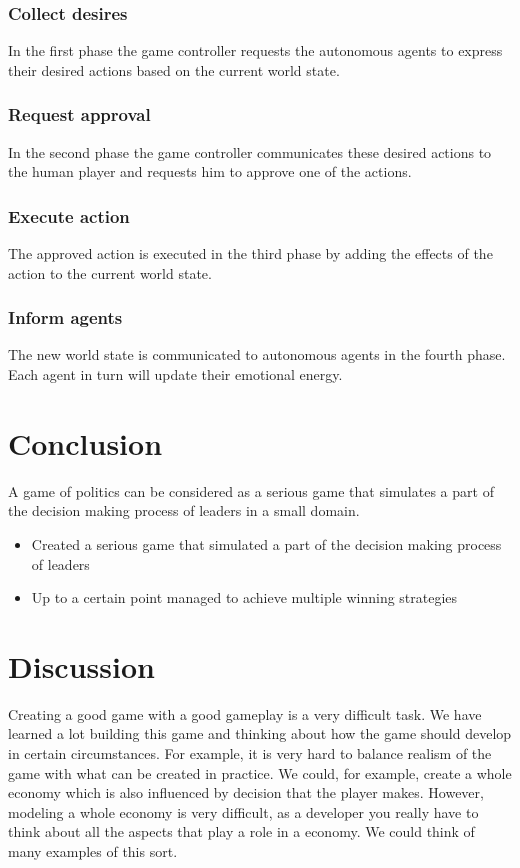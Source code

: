 \documentclass[11pt,a4paper]{article}
\begin{document}
    \subsubsection{Collect desires}
      In the first phase the game controller requests the autonomous agents to express their desired actions based on the current world state.
    \subsubsection{Request approval}
      In the second phase the game controller communicates these desired actions to the human player and requests him to approve one of the actions.
    \subsubsection{Execute action}
      The approved action is executed in the third phase by adding the effects of the action to the current world state.
    \subsubsection{Inform agents}
      The new world state is communicated to autonomous agents in the fourth phase. Each agent in turn will update their emotional energy. 

\section{Conclusion}
A game of politics can be considered as a serious game that simulates a part of the decision making process of leaders in a small domain. 

 
  \begin{itemize}
    \item Created a serious game that simulated a part of the decision making process of leaders
    \item Up to a certain point managed to achieve multiple winning strategies
  \end{itemize}
  
\section{Discussion}
Creating a good game with a good gameplay is a very difficult task. We have learned a lot building this game and thinking about how the game should develop in certain circumstances. For example, it is very hard to balance realism of the game with what can be created in practice. We could, for example, create a whole economy which is also influenced by decision that the player makes. However, modeling a whole economy is very difficult, as a developer you really have to think about all the aspects that play a role in a economy. We could think of many examples of this sort. 
\end{document}
